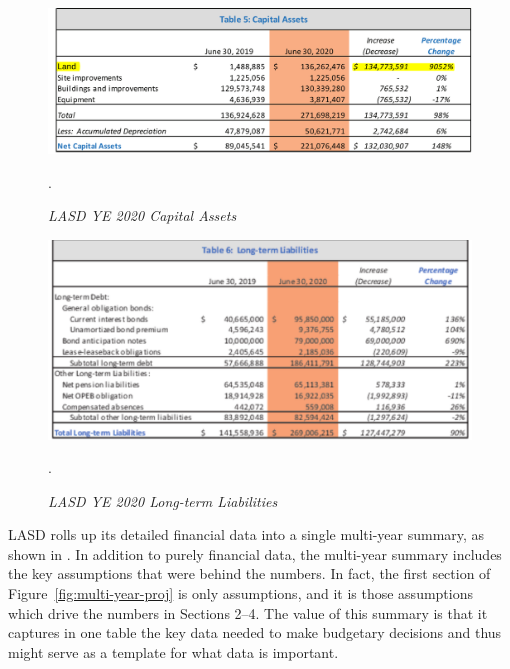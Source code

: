 \begin{figure}
  \centering
  \caption[LASD YE 2020 Capital Assets]{\textit{LASD YE 2020 Capital Assets}}%
  \label{fig:Capital_Assets}
  \includegraphics[width=\textwidth]{CAFR-YE2020_Capital_Assets}\\
  \footnotesize\raggedright\textcite[10]{Kenyon2021}.
\end{figure}

\begin{figure}
  \centering
  \caption[LASD YE 2020 Long-term Liabilities]{\textit{LASD YE 2020 Long-term Liabilities}}%
  \label{fig:Long-term_Liabilities}
  \includegraphics[width=\textwidth]{CAFR-YE2020_Long-term_Liabilities}\\
  \footnotesize\raggedright\textcite[11]{Kenyon2021}.
\end{figure}%

LASD rolls up its detailed financial data into a single multi-year summary, as shown in . In addition to purely financial data, the multi-year summary includes the key
assumptions that were behind the numbers. In fact, the first section of Figure~\ref{fig:multi-year-proj} is only assumptions, and it is those assumptions which drive the numbers in Sections 2–4. The value of this summary is that it captures in one table the key data needed to make budgetary decisions and thus might serve as a template for what data is important. 

